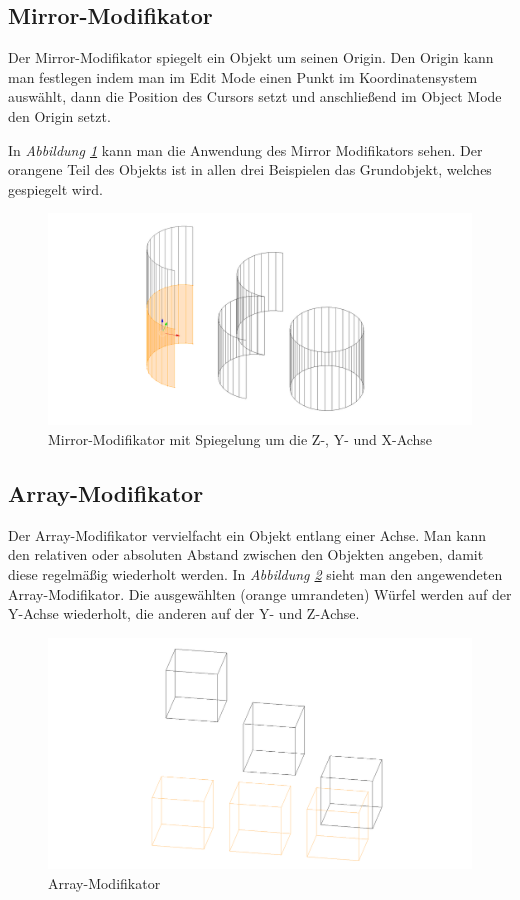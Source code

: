 \subsection{Mirror-Modifikator}
\label{Mirror:heading}
Der Mirror-Modifikator spiegelt ein Objekt um seinen Origin.\citep{blender:mirror_modifier}
Den Origin kann man festlegen indem man im Edit Mode einen Punkt im Koordinatensystem auswählt, dann die Position des Cursors setzt
und anschließend im Object Mode den Origin setzt.

In \textit{Abbildung \ref{modifikatoren:image2}} kann man die Anwendung des Mirror Modifikators sehen. Der orangene Teil des Objekts ist in allen drei Beispielen das
Grundobjekt, welches gespiegelt wird.

\begin{figure}[H]
    \centering
    \includegraphics[width=.8\textwidth]{images/Modifikatoren-Mirror.png}
    \caption{Mirror-Modifikator mit Spiegelung um die Z-, Y- und X-Achse}
    \label{modifikatoren:image2}
\end{figure}

\subsection{Array-Modifikator}
\label{Array:heading}
Der Array-Modifikator vervielfacht ein Objekt entlang einer Achse. Man kann den relativen oder absoluten Abstand zwischen den Objekten
angeben, damit diese regelmäßig wiederholt werden.\citep{blender:array_modifier} In \textit{Abbildung \ref{modifikatoren:image3}} sieht man den angewendeten Array-Modifikator.
Die ausgewählten (orange umrandeten) Würfel werden auf der Y-Achse
wiederholt, die anderen auf der Y- und Z-Achse.
\begin{figure}[H]
    \centering
    \includegraphics[width=.8\textwidth]{images/Modifikatoren-Array.png}
    \caption{Array-Modifikator}
    \label{modifikatoren:image3}
\end{figure}

